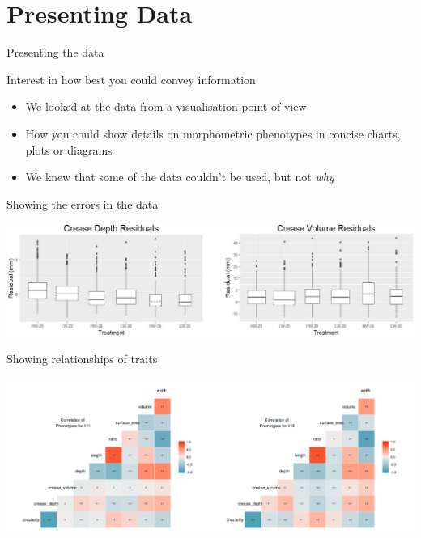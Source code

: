 \documentclass[t, aspectratio=169]{beamer}
\begin{document}
\section{Presenting Data}
\label{sec:org3a51122}
\begin{frame}[label={sec:org9d04587}]{Presenting the data}
\begin{block}{Interest in how best you could convey information}
\begin{itemize}
\item We looked at the data from a visualisation point of view
\item How you could show details on morphometric phenotypes in concise charts, plots or diagrams
\item We knew that some of the data couldn't be used, but not \emph{why}
\end{itemize}
\end{block}
\end{frame}
\begin{frame}[label={sec:org0b478b2}]{Showing the errors in the data}
\begin{center}
\includegraphics[width=14cm]{./peter.png}
\end{center}
\end{frame}

\begin{frame}[label={sec:org9888885}]{Showing relationships of traits}
\begin{center}
\includegraphics[width=14cm]{./corrmatrix.png}
\end{center}
\end{frame}
\end{document}
